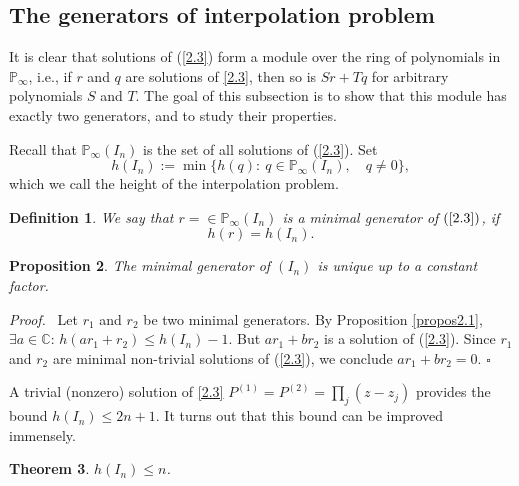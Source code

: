 \documentclass{amsart}
\newtheorem{theorem}{Theorem}[section]
\newtheorem{proposition}[theorem]{Proposition}
\newtheorem{definition}[theorem]{Definition}
\begin{document}
\subsection{The generators of interpolation problem}

It is clear that solutions of (\ref{2.3}) form a module over the
ring of polynomials in ${{\mathbb P}}_\infty$, i.e., if $r$ and $q$ are
solutions of \eqref{2.3}, then so is $Sr+Tq$ for arbitrary
polynomials $S$ and $T$. The goal of this subsection is to show that
this module has exactly two generators, and to study their
properties.

Recall that ${{\mathbb P}}_\infty(I_n)$ is the set of all solutions of
(\ref{2.3}). Set
$$ h(I_n) := \min \bigl\{ h(q): \ q\in{{\mathbb P}}_\infty(I_n), \quad q\ne 0 \bigr\},
$$
which we call the height of the interpolation problem.

\begin{definition}\label{def2}
We say that $r=\in {{\mathbb P}}_\infty(I_n)$ is a minimal generator of
$(\ref{2.3})$, if
$$ h(r) = h(I_n).
$$
\end{definition}

\begin{proposition} \label{propos2.8}
{\it The minimal generator of $(I_n)$ is unique up to a constant
factor.}
\end{proposition}

{\it Proof.} \ Let $r_1$ and $r_2$ be two minimal generators. By
Proposition \ref{propos2.1}, $\exists a \in {{\mathbb C}}$: $h(ar_1 + r_2)
\leq h(I_n) -1$. But $ar_1+br_2$ is a solution of (\ref{2.3}). Since
$r_1$ and $r_2$ are minimal non-trivial solutions of (\ref{2.3}), we
conclude $a r_1 + b r_2=0$. \hfill $\square$

\medskip

A trivial (nonzero) solution of \eqref{2.3}
$P^{(1)}=P^{(2)}=\prod_j(z-z_j)$ provides the bound $h(I_n)\le
2n+1$. It turns out that this bound can be improved immensely.

\begin{theorem}\label{theor2.6}
$ h(I_n) \leq n$.
\end{theorem}
\end{document}
